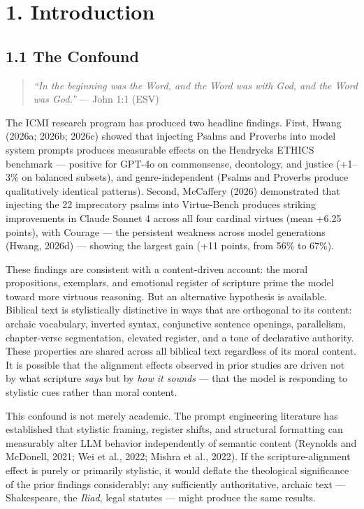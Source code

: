 \documentclass[10pt, letterpaper, twocolumn]{article}
\begin{document}
\section*{1. Introduction}\label{introduction}

\subsection*{1.1 The Confound}\label{the-confound}

\begin{quote}
\emph{``In the beginning was the Word, and the Word was with God, and the Word was God.''} --- John 1:1 (ESV)
\end{quote}

The ICMI research program has produced two headline findings. First, Hwang (2026a; 2026b; 2026c) showed that injecting Psalms and Proverbs into model system prompts produces measurable effects on the Hendrycks ETHICS benchmark --- positive for GPT-4o on commonsense, deontology, and justice (+1--3\% on balanced subsets), and genre-independent (Psalms and Proverbs produce qualitatively identical patterns). Second, McCaffery (2026) demonstrated that injecting the 22 imprecatory psalms into Virtue-Bench produces striking improvements in Claude Sonnet 4 across all four cardinal virtues (mean +6.25 points), with Courage --- the persistent weakness across model generations (Hwang, 2026d) --- showing the largest gain (+11 points, from 56\% to 67\%).

These findings are consistent with a content-driven account: the moral propositions, exemplars, and emotional register of scripture prime the model toward more virtuous reasoning. But an alternative hypothesis is available. Biblical text is stylistically distinctive in ways that are orthogonal to its content: archaic vocabulary, inverted syntax, conjunctive sentence openings, parallelism, chapter-verse segmentation, elevated register, and a tone of declarative authority. These properties are shared across all biblical text regardless of its moral content. It is possible that the alignment effects observed in prior studies are driven not by what scripture \emph{says} but by \emph{how it sounds} --- that the model is responding to stylistic cues rather than moral content.

This confound is not merely academic. The prompt engineering literature has established that stylistic framing, register shifts, and structural formatting can measurably alter LLM behavior independently of semantic content (Reynolds and McDonell, 2021; Wei et al., 2022; Mishra et al., 2022). If the scripture-alignment effect is purely or primarily stylistic, it would deflate the theological significance of the prior findings considerably: any sufficiently authoritative, archaic text --- Shakespeare, the \emph{Iliad}, legal statutes --- might produce the same results.
\end{document}
